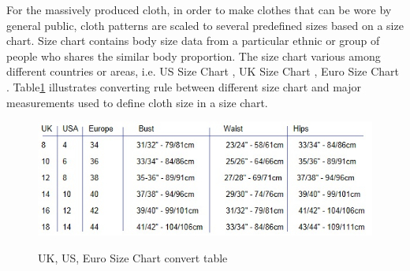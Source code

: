 For the massively produced cloth, in order to make clothes that can be wore by general public, cloth patterns are scaled to several predefined sizes based on a size chart. Size chart contains body size data from a particular ethnic or group of people who shares the similar body proportion. The size chart various among different countries or areas, i.e. US Size Chart , UK Size Chart , Euro Size Chart . Table\ref{Table:Size_Chart} illustrates converting rule between different size chart and major measurements used to define cloth size in a size chart.

 \begin{figure}[H]
    \centering
	\includegraphics[width=1\columnwidth]{../images/cloth_design/size_chart}\\[1cm]
    \caption{UK, US, Euro Size Chart convert table}
    \label{Table:Size_Chart}
\end{figure} 

